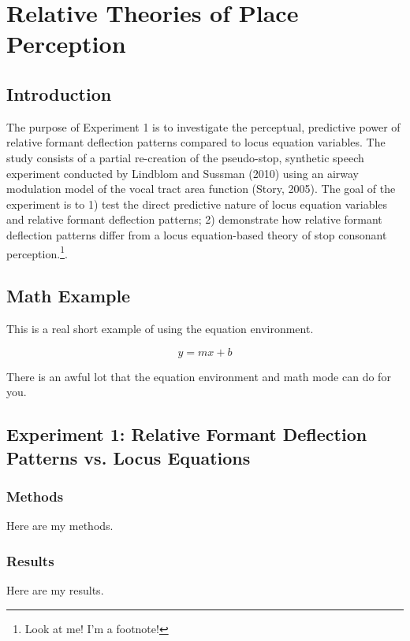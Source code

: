 \documentclass[dissertation,copyright]{uathesis}
\begin{document}



 



\chapter{Relative Theories of Place Perception\label{chapter1}}


\section{Introduction}

The purpose of Experiment 1 is to investigate the perceptual, predictive power of relative formant deflection patterns compared to locus equation variables. The study consists of a partial re-creation of the pseudo-stop, synthetic speech experiment conducted by Lindblom and Sussman (2010) using an airway modulation model of the vocal tract area function (Story, 2005). The goal of the experiment is to 1) test the direct predictive nature of locus equation variables and relative formant deflection patterns; 2) demonstrate how relative formant deflection patterns differ from a locus equation-based theory of stop consonant perception.\footnote{Look at me!  I'm a footnote!}.


\section{Math Example\label{math}}

This is a real short example of using the equation environment.

\begin{equation}
	y = mx + b
\end{equation}

There is an awful lot that the equation environment and math mode
can do for you.

\section{Experiment 1: Relative Formant Deflection Patterns vs. Locus Equations\label{Exp1}}
\subsection{Methods}
Here are my methods.
\subsection{Results}
Here are my results. 
\end{document}
